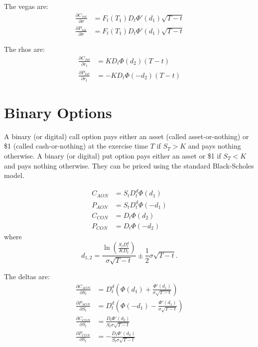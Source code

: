 The vegas are: 
\begin{align}
  \frac{\partial C_{fut}}{\partial \sigma} 
	  &= F_t(T_1) D_t \Phi'(d_1) \sqrt{T-t}    \\
  \frac{\partial P_{fut}}{\partial \sigma} 
	  &= F_t(T_1) D_t \Phi'(d_1) \sqrt{T-t}
\end{align}

The rhos are: 
\begin{align}
  \frac{\partial C_{fut}}{\partial r_t} &= K D_t \Phi(d_2) (T-t)  \\
	\frac{\partial P_{fut}}{\partial r_t} &= - K D_t \Phi(-d_2) (T-t)
\end{align}

\section{Binary Options}
A binary (or digital) call option pays either an asset (called asset-or-nothing)
or \$1 (called cash-or-nothing) at the exercise time $T$ if $S_T>K$ and pays nothing otherwise.
A binary (or digital) put option pays either an asset or \$1 if $S_T<K$ and 
pays nothing otherwise. They can be priced using the standard Black-Scholes
model.

\begin{align}
	C_{AON} &= S_t D_t^d \Phi(d_1)   \\
	P_{AON} &= S_t D_t^d \Phi(-d_1)  \\
	C_{CON} &= D_t \Phi(d_2)         \\
	P_{CON} &= D_t \Phi(-d_2)        
\end{align}
where
\[
  d_{1,2}=\frac{\ln\left( \frac{S_t D_t^d}{K D_t} \right)}{\sigma\sqrt{T-t}}
          \pm \frac{1}{2} \sigma\sqrt{T-t}.
\]

The deltas are:
\begin{align}
	\frac{\partial C_{AON}}{\partial S_t}  
  	&= D_t^d (\Phi(d_1) + \frac{\Phi'(d_1)}{\sigma\sqrt{T-t}})  \\
	\frac{\partial P_{AON}}{\partial S_t}  
  	&= D_t^d (\Phi(-d_1) - \frac{\Phi'(d_1)}{\sigma\sqrt{T-t}})  \\
	\frac{\partial C_{CON}}{\partial S_t}  
  	&= \frac{D_t \Phi'(d_2)}{S_t \sigma\sqrt{T-t}}        \\
	\frac{\partial P_{CON}}{\partial S_t}  
  	&= - \frac{D_t \Phi'(d_2)}{S_t \sigma\sqrt{T-t}}        
\end{align}

